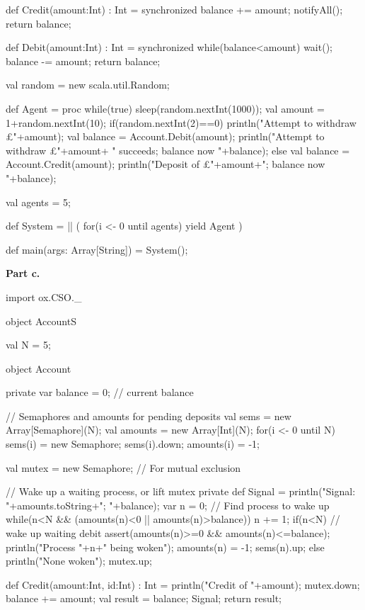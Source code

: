 \begin{answer}
\begin{scala}
{{    def Credit(amount:Int) : Int = synchronized{
      balance += amount;
      notifyAll();
      return balance;
    }

    def Debit(amount:Int) : Int = synchronized{
      while(balance<amount) wait();
      balance -= amount;
      return balance;
    }
  }

  val random = new scala.util.Random;

  def Agent = proc{
    while(true){
      sleep(random.nextInt(1000));
      val amount = 1+random.nextInt(10); 
      if(random.nextInt(2)==0){
	println("Attempt to withdraw £"+amount);
	val balance = Account.Debit(amount);
	println("Attempt to withdraw £"+amount+
		" succeeds; balance now "+balance);
      }
      else{
	val balance = Account.Credit(amount);
	println("Deposit of £"+amount+"; balance now "+balance);
      }
    }
  }

  val agents = 5;

  def System = || ( for(i <- 0 until agents) yield Agent )

  def main(args: Array[String]) = System();
}
\end{scala}


\noindent
{\bf Part c.}
%
\begin{scala}
import ox.CSO._

object AccountS{
  val N = 5;

  object Account{
    private var balance = 0; // current balance

    // Semaphores and amounts for pending deposits
    val sems = new Array[Semaphore](N);
    val amounts = new Array[Int](N); 
    for(i <- 0 until N){ 
      sems(i) = new Semaphore; sems(i).down; amounts(i) = -1; 
    }

    val mutex = new Semaphore; // For mutual exclusion

    // Wake up a waiting process, or lift mutex
    private def Signal = {
      println("Signal: "+amounts.toString+"; "+balance);
      var n = 0;
      // Find process to wake up
      while(n<N && (amounts(n)<0 || amounts(n)>balance)) n += 1;
      if(n<N){ // wake up waiting debit
	assert(amounts(n)>=0 && amounts(n)<=balance);
	println("Process "+n+" being woken");
	amounts(n) = -1;
	sems(n).up;
      }
      else{
	println("None woken"); mutex.up;
      }
    }

    def Credit(amount:Int, id:Int) : Int = {
      println("Credit of "+amount);
      mutex.down;
      balance += amount;
      val result = balance;
      Signal;
      return result;
    }

}}
\end{scala}
\end{answer}
